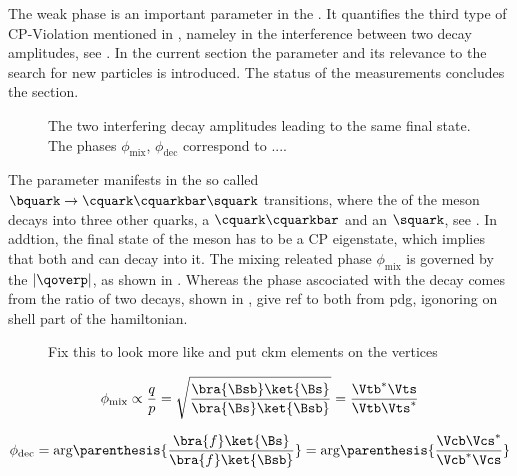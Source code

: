 The weak phase \phis is an important parameter in the \BBbarSyst. It quantifies the third
type of CP-Violation mentioned in , nameley in the interference between
two decay amplitudes, see . In the current section the parameter \phis
and its relevance to the search for new particles is introduced. The status of the \phis
measurements concludes the section.

\newcommand{\ffig}{f}
\newcommand{\phimixfig}{\phi_\text{mix}}
\newcommand{\phifig}{\phi_\text{dec}}
\newcommand{\phibarfig}{\kern 0.15em \overline{\kern -0.15em \phi_\text{dec} \kern -0.60em} \kern 0.60em}
\begin{figure}[h]
  \centering
  \resizebox{0.4\textwidth}{!}{}
  \caption{The two interfering decay amplitudes leading to the same final state.
           The phases $\phimixfig$, $\phifig$ correspond to ....
           }
  \label{interference}
\end{figure}

The parameter \phis manifests in the so called $\bquark \rightarrow \cquark\cquarkbar\squark $ transitions, where the
\bquark of the \Bs meson decays into three other quarks, a $\cquark\cquarkbar$ and an $\squark$, see .
In addtion, the final state of the \Bs meson has to be a CP eigenstate, which implies that both \Bs and \Bsb
can decay into it. The mixing releated phase $\phimixfig$ is governed by the $|\qoverp|$, as shown in .
Whereas the phase ascociated with the decay comes from the ratio of two decays, shown in , {\color{red} give ref to both from pdg}, igonoring on shell part of the hamiltonian.

\begin{figure}[h]
  \centering
  {\sffamily }
  \caption{{\color{red} Fix this to look more like  and put ckm elements on the vertices}}
  \label{b2ccs}
\end{figure}

\begin{equation}
 \phimixfig \propto \frac{q}{p} = \sqrt{ \frac{\bra{\Bsb}\ket{\Bs}}{\bra{\Bs}\ket{\Bsb}}} = \frac{\Vtb^*\Vts}{\Vtb\Vts^*}
\label{phase_mix}
\end{equation}

\begin{equation}
 \phifig = \text{arg}\parenthesis{\frac{\bra{f}\ket{\Bs}} {\bra{f}\ket{\Bsb}} } = \text{arg}\parenthesis{\frac{\Vcb\Vcs^*}{\Vcb^*\Vcs}}
\label{phase_decay}
\end{equation}

